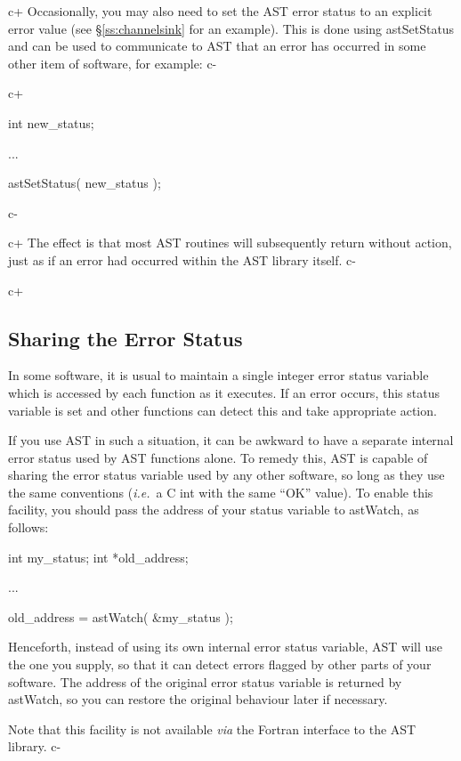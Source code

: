 \documentclass[twoside,11pt]{starlink}
\providecommand{\secref}[1]{\S\ref{#1}}
\begin{document}
c+
Occasionally, you may also need to set the AST error status to an
explicit error value (see \secref{ss:channelsink} for an
example). This is done using astSetStatus and can be used to
communicate to AST that an error has occurred in some other item of
software, for example:
c-

c+
\small
\begin{terminalv}
int new_status;

...

astSetStatus( new_status );
\end{terminalv}
\normalsize
c-

c+
The effect is that most AST routines will subsequently return without
action, just as if an error had occurred within the AST library
itself.
c-

c+
\subsection{Sharing the Error Status}

In some software, it is usual to maintain a single integer error
status variable which is accessed by each function as it executes. If
an error occurs, this status variable is set and other functions can
detect this and take appropriate action.

If you use AST in such a situation, it can be awkward to have a
separate internal error status used by AST functions alone. To remedy
this, AST is capable of sharing the error status variable used by any
other software, so long as they use the same conventions
(\emph{i.e.}\ a C int with the same ``OK'' value). To enable this
facility, you should pass the address of your status variable to
astWatch, as follows:

\small
\begin{terminalv}
int my_status;
int *old_address;

...

old_address = astWatch( &my_status );
\end{terminalv}
\normalsize

Henceforth, instead of using its own internal error status variable,
AST will use the one you supply, so that it can detect errors flagged
by other parts of your software. The address of the original error
status variable is returned by astWatch, so you can restore the
original behaviour later if necessary.

Note that this facility is not available \emph{via} the Fortran
interface to the AST library.
c-
\end{document}
